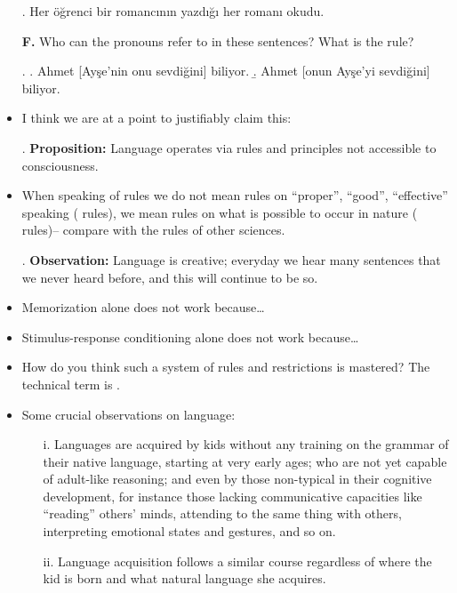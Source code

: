 \documentclass[11pt]{article}
\begin{document}
\begin{itemize}
\ex. Her öğrenci bir romancının yazdığı her romanı okudu.


\item[\bf F.] Who can the pronouns refer to 
in these sentences?  What is the rule?

\ex. 
\a. Ahmet [Ayşe'nin onu sevdiğini] biliyor.
\b. Ahmet [onun Ayşe'yi sevdiğini] biliyor.

\item I think we are at a point to justifiably claim this:

\ex. {\bf Proposition:} 
Language operates via rules and principles not accessible to
consciousness.


\item When speaking of rules we do not mean rules on ``proper'', ``good'',
``effective'' speaking ( rules), we mean rules on what is
possible to occur in nature ( rules)-- compare with the rules of other sciences.  



\ex. {\bf Observation:}
Language is creative; everyday we hear many sentences that we never heard
before, and this will continue to be so. 


\item Memorization alone does not work because\ldots

\item Stimulus-response conditioning alone does not work because\ldots


\item How do you think such a system of rules and restrictions is mastered?
The technical term is .

\item Some crucial observations on language:
	\begin{itemize}
\item[i.] Languages are acquired by kids without any training on the
grammar of their native language, starting at very early ages;
 who are not yet capable of adult-like reasoning; and even by those
non-typical in their cognitive development, for instance those lacking
communicative capacities like ``reading'' others' minds, attending to the same
thing with others, interpreting emotional states and gestures, and so on.

\item[ii.] Language acquisition follows a similar course
regardless of where the kid is born and what natural language she acquires. 


\end{itemize}
\end{itemize}
\end{document}
